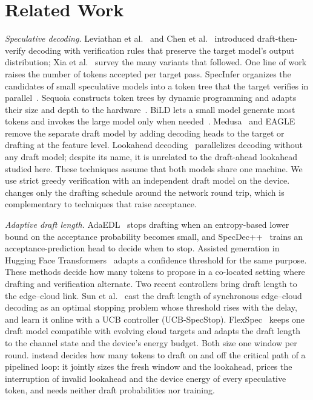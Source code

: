 \section{Related Work}
\label{sec:related}

\emph{Speculative decoding.} Leviathan et al.~\cite{leviathan2023} and Chen et al.~\cite{chen2023} introduced draft-then-verify decoding with verification rules that preserve the target model's output distribution; Xia et al.~\cite{xia2024survey} survey the many variants that followed. One line of work raises the number of tokens accepted per target pass. SpecInfer organizes the candidates of small speculative models into a token tree that the target verifies in parallel~\cite{specinfer2024}. Sequoia constructs token trees by dynamic programming and adapts their size and depth to the hardware~\cite{sequoia2024}. BiLD lets a small model generate most tokens and invokes the large model only when needed~\cite{bild2023}. Medusa~\cite{medusa2024} and EAGLE~\cite{eagle2024} remove the separate draft model by adding decoding heads to the target or drafting at the feature level. Lookahead decoding~\cite{lookahead2024} parallelizes decoding without any draft model; despite its name, it is unrelated to the draft-ahead lookahead studied here. These techniques assume that both models share one machine. We use strict greedy verification with an independent draft model on the device. \cape{} changes only the drafting schedule around the network round trip, which is complementary to techniques that raise acceptance.

\emph{Adaptive draft length.} AdaEDL~\cite{adaedl2024} stops drafting when an entropy-based lower bound on the acceptance probability becomes small, and SpecDec++~\cite{specdecpp2025} trains an acceptance-prediction head to decide when to stop. Assisted generation in Hugging Face Transformers~\cite{transformers2020} adapts a confidence threshold for the same purpose. These methods decide how many tokens to propose in a co-located setting where drafting and verification alternate. Two recent controllers bring draft length to the edge--cloud link. Sun et al.~\cite{delayadaptive2026} cast the draft length of synchronous edge--cloud decoding as an optimal stopping problem whose threshold rises with the delay, and learn it online with a UCB controller (UCB-SpecStop). FlexSpec~\cite{flexspec2026} keeps one draft model compatible with evolving cloud targets and adapts the draft length to the channel state and the device's energy budget. Both size one window per round. \cape{} instead decides how many tokens to draft on and off the critical path of a pipelined loop: it jointly sizes the fresh window and the lookahead, prices the interruption of invalid lookahead and the device energy of every speculative token, and needs neither draft probabilities nor training.

